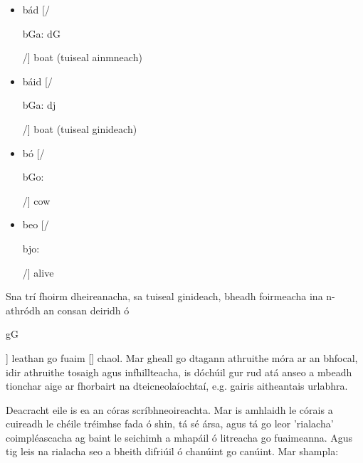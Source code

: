 \begin{multicols}{2}
\begin{itemize}
\item bád    [/\begin{IPA}b\super Ga: d\super G\end{IPA}/]  boat  (tuiseal ainmneach)
\item báid   [/\begin{IPA}b\super Ga: d\super j\end{IPA}/]  boat  (tuiseal ginideach)
\end{itemize}

\begin{itemize}
\item bó [/\begin{IPA}b\super Go: \end{IPA}/] cow 
\item beo [/\begin{IPA}b\super jo: \end{IPA}/] alive  
\end{itemize}  

Sna trí fhoirm dheireanacha, sa tuiseal ginideach, bheadh foirmeacha ina n-athródh an consan deiridh ó \begin{IPA}g\super G\end{IPA}] leathan go fuaim [] chaol. Mar gheall go dtagann athruithe móra ar an bhfocal, idir athruithe tosaigh agus infhillteacha, is dóchúil gur rud atá anseo a mbeadh tionchar aige ar fhorbairt na dteicneolaíochtaí, e.g. gairis aitheantais urlabhra. 

Deacracht eile is ea an córas scríbhneoireachta. Mar is amhlaidh le córais a cuireadh le chéile tréimhse fada ó shin, tá sé ársa, agus tá go leor 'rialacha’ coimpléascacha ag baint le seichimh a mhapáil ó litreacha go fuaimeanna. Agus tig leis na rialacha seo a bheith difriúil ó chanúint go canúint. Mar shampla:


\end{multicols}
